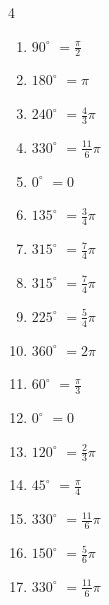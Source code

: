 \begin{multicols}{4}
\begin{enumerate}
  \item $\displaystyle 90^{\circ}$
        $\displaystyle =\frac{\pi}{2}$

  \item $\displaystyle 180^{\circ}$
        $\displaystyle =\pi$

  \item $\displaystyle 240^{\circ}$
        $\displaystyle =\frac{4}{3}\pi$

  \item $\displaystyle 330^{\circ}$
        $\displaystyle =\frac{11}{6}\pi$

  \item $\displaystyle 0^{\circ}$
        $\displaystyle =0$

  \item $\displaystyle 135^{\circ}$
        $\displaystyle =\frac{3}{4}\pi$

  \item $\displaystyle 315^{\circ}$
        $\displaystyle =\frac{7}{4}\pi$

  \item $\displaystyle 315^{\circ}$
        $\displaystyle =\frac{7}{4}\pi$

  \item $\displaystyle 225^{\circ}$
        $\displaystyle =\frac{5}{4}\pi$

  \item $\displaystyle 360^{\circ}$
        $\displaystyle =2\pi$

  \item $\displaystyle 60^{\circ}$
        $\displaystyle =\frac{\pi}{3}$

  \item $\displaystyle 0^{\circ}$
        $\displaystyle =0$

  \item $\displaystyle 120^{\circ}$
        $\displaystyle =\frac{2}{3}\pi$

  \item $\displaystyle 45^{\circ}$
        $\displaystyle =\frac{\pi}{4}$

  \item $\displaystyle 330^{\circ}$
        $\displaystyle =\frac{11}{6}\pi$

  \item $\displaystyle 150^{\circ}$
        $\displaystyle =\frac{5}{6}\pi$

  \item $\displaystyle 330^{\circ}$
        $\displaystyle =\frac{11}{6}\pi$


\end{enumerate}
\end{multicols}

